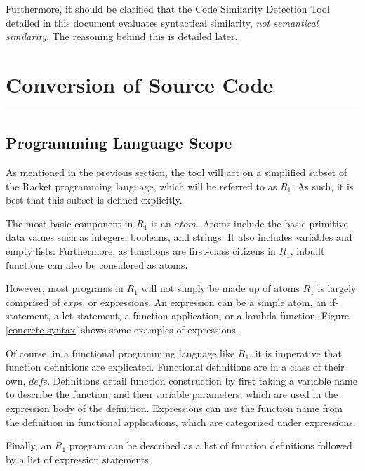 \documentclass[12pt]{article}
\newcommand{\R}{\ensuremath{\mathit{R_{1}}}}
\newcommand{\itm}[1]{\ensuremath{\mathit{#1}}}
\newcommand{\Atm}[0]{\itm{atom}}
\newcommand{\Exp}[0]{\itm{exp}}
\newcommand{\Def}[0]{\itm{def}}
\newcommand{\usection}[1]{\section{#1}\hrule\hfill}
\begin{document}
\hfill

Furthermore, it should be clarified that the Code Similarity Detection Tool detailed in this document evaluates syntactical similarity, \emph{not semantical similarity}. The reasoning behind this is detailed later.

\usection{Conversion of Source Code}

\subsection{Programming Language Scope}

As mentioned in the previous section, the tool will act on a simplified subset of the Racket programming language, which will be referred to as \R{}. As such, it is best that this subset is defined explicitly.

\hfill

The most basic component in \R{} is an \Atm{}. Atoms include the basic primitive data values such as integers, booleans, and strings. It also includes variables and empty lists. Furthermore, as functions are first-class citizens in \R{}, inbuilt functions can also be considered as atoms.

\hfill

However, most programs in \R{} will not simply be made up of atoms \textemdash \R{} is largely comprised of \Exp{}s, or expressions. An expression can be a simple atom, an if-statement, a let-statement, a function application, or a lambda function. Figure \ref{concrete-syntax} shows some examples of expressions.

\hfill

Of course, in a functional programming language like \R{}, it is imperative that function definitions are explicated. Functional definitions are in a class of their own, \Def{}s. Definitions detail function construction by first taking a variable name to describe the function, and then variable parameters, which are used in the expression body of the definition. Expressions can use the function name from the definition in functional applications, which are categorized under expressions.

\hfill

Finally, an \R{} program can be described as a list of function definitions followed by a list of expression statements.
\end{document}
